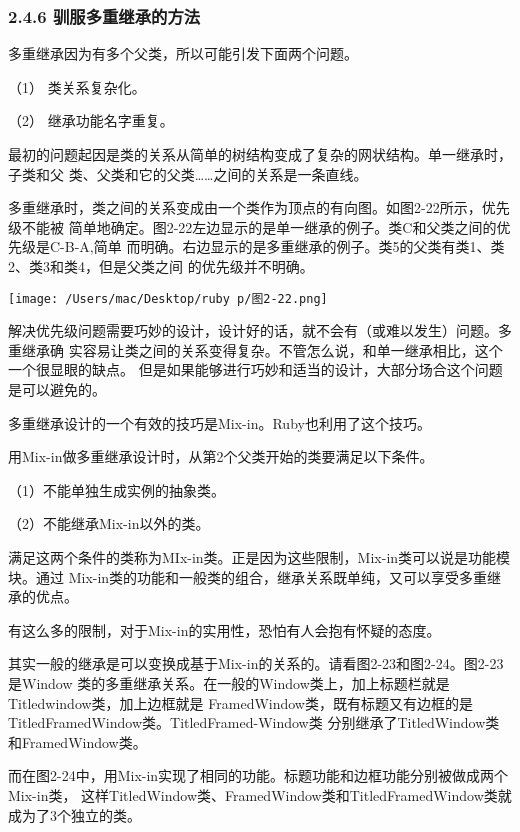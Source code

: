 \documentclass[11pt]{ctexart}
\begin{document}
\subsubsection{2.4.6 驯服多重继承的方法}
\label{sec:orgecc3141}

多重继承因为有多个父类，所以可能引发下面两个问题。

（1） 类关系复杂化。

（2） 继承功能名字重复。

最初的问题起因是类的关系从简单的树结构变成了复杂的网状结构。单一继承时，子类和父
类、父类和它的父类……之间的关系是一条直线。

多重继承时，类之间的关系变成由一个类作为顶点的有向图。如图2-22所示，优先级不能被
简单地确定。图2-22左边显示的是单一继承的例子。类C和父类之间的优先级是C-B-A,简单
而明确。右边显示的是多重继承的例子。类5的父类有类1、类2、类3和类4，但是父类之间
的优先级并不明确。

\begin{center}
\texttt{[image: /Users/mac/Desktop/ruby p/图2-22.png]}
\end{center}

解决优先级问题需要巧妙的设计，设计好的话，就不会有（或难以发生）问题。多重继承确
实容易让类之间的关系变得复杂。不管怎么说，和单一继承相比，这个一个很显眼的缺点。
但是如果能够进行巧妙和适当的设计，大部分场合这个问题是可以避免的。

多重继承设计的一个有效的技巧是Mix-in。Ruby也利用了这个技巧。

用Mix-in做多重继承设计时，从第2个父类开始的类要满足以下条件。

（1）不能单独生成实例的抽象类。

（2）不能继承Mix-in以外的类。

满足这两个条件的类称为MIx-in类。正是因为这些限制，Mix-in类可以说是功能模块。通过
Mix-in类的功能和一般类的组合，继承关系既单纯，又可以享受多重继承的优点。

有这么多的限制，对于Mix-in的实用性，恐怕有人会抱有怀疑的态度。

其实一般的继承是可以变换成基于Mix-in的关系的。请看图2-23和图2-24。图2-23是Window
类的多重继承关系。在一般的Window类上，加上标题栏就是Titledwindow类，加上边框就是
FramedWindow类，既有标题又有边框的是TitledFramedWindow类。TitledFramed-Window类
分别继承了TitledWindow类和FramedWindow类。

而在图2-24中，用Mix-in实现了相同的功能。标题功能和边框功能分别被做成两个Mix-in类，
这样TitledWindow类、FramedWindow类和TitledFramedWindow类就成为了3个独立的类。
\end{document}
